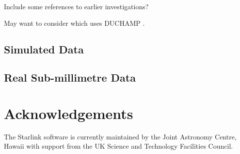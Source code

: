 \documentclass[final,authoryear,5p,times,twocolumn]{elsarticle}
\begin{document}
Include some references to earlier investigations? \citep[e.g.][]{2010Watson}

May want to consider \citep{2012PASA...29..301W} which uses
DUCHAMP \citep[][]{2012MNRAS.421.3242W}.

\subsection{Simulated Data}

\subsection{Real Sub-millimetre Data}


\section{Acknowledgements}

The Starlink software is currently maintained by the Joint Astronomy
Centre, Hawaii with support from the UK Science and Technology
Facilities Council.



\end{document}
